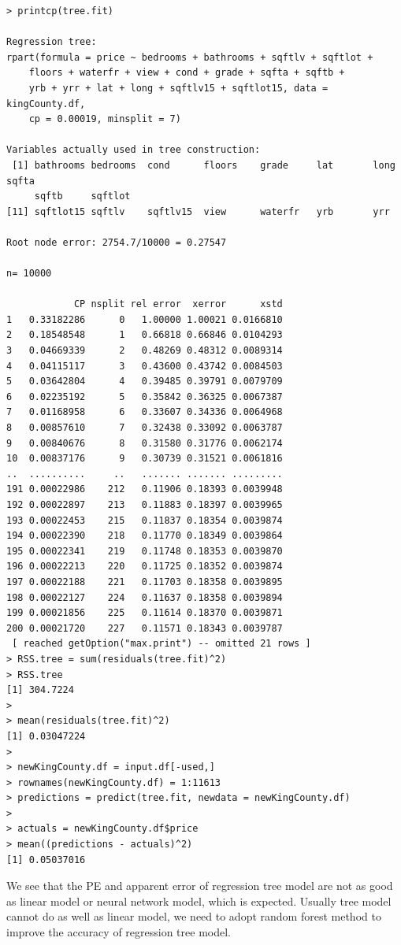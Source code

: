 \documentclass{article}%
\begin{document}
\begin{verbatim}
> printcp(tree.fit)

Regression tree:
rpart(formula = price ~ bedrooms + bathrooms + sqftlv + sqftlot +
    floors + waterfr + view + cond + grade + sqfta + sqftb +
    yrb + yrr + lat + long + sqftlv15 + sqftlot15, data = kingCounty.df,
    cp = 0.00019, minsplit = 7)

Variables actually used in tree construction:
 [1] bathrooms bedrooms  cond      floors    grade     lat       long      sqfta
     sqftb     sqftlot
[11] sqftlot15 sqftlv    sqftlv15  view      waterfr   yrb       yrr

Root node error: 2754.7/10000 = 0.27547

n= 10000

            CP nsplit rel error  xerror      xstd
1   0.33182286      0   1.00000 1.00021 0.0166810
2   0.18548548      1   0.66818 0.66846 0.0104293
3   0.04669339      2   0.48269 0.48312 0.0089314
4   0.04115117      3   0.43600 0.43742 0.0084503
5   0.03642804      4   0.39485 0.39791 0.0079709
6   0.02235192      5   0.35842 0.36325 0.0067387
7   0.01168958      6   0.33607 0.34336 0.0064968
8   0.00857610      7   0.32438 0.33092 0.0063787
9   0.00840676      8   0.31580 0.31776 0.0062174
10  0.00837176      9   0.30739 0.31521 0.0061816
..  ..........     ..   ....... ....... .........
191 0.00022986    212   0.11906 0.18393 0.0039948
192 0.00022897    213   0.11883 0.18397 0.0039965
193 0.00022453    215   0.11837 0.18354 0.0039874
194 0.00022390    218   0.11770 0.18349 0.0039864
195 0.00022341    219   0.11748 0.18353 0.0039870
196 0.00022213    220   0.11725 0.18352 0.0039874
197 0.00022188    221   0.11703 0.18358 0.0039895
198 0.00022127    224   0.11637 0.18358 0.0039894
199 0.00021856    225   0.11614 0.18370 0.0039871
200 0.00021720    227   0.11571 0.18343 0.0039787
 [ reached getOption("max.print") -- omitted 21 rows ]
> RSS.tree = sum(residuals(tree.fit)^2)
> RSS.tree
[1] 304.7224
>
> mean(residuals(tree.fit)^2)
[1] 0.03047224
>
> newKingCounty.df = input.df[-used,]
> rownames(newKingCounty.df) = 1:11613
> predictions = predict(tree.fit, newdata = newKingCounty.df)
>
> actuals = newKingCounty.df$price
> mean((predictions - actuals)^2)
[1] 0.05037016
\end{verbatim}

\indent We see that the PE and apparent error of regression tree model are not as good as linear model or neural network model, which is expected. Usually tree model cannot do as well as linear model, we need to adopt random forest method to improve the accuracy of regression tree model.
\end{document}

